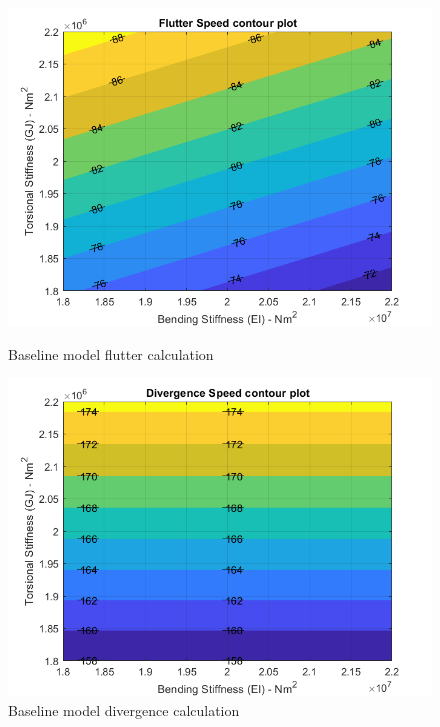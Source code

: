 \documentclass[11pt]{article}
\begin{document}
\begin{figure}[!hbt]
    \begin{minipage}{.5\textwidth}
    \centering
    \includegraphics[width = \textwidth]{figures/CooperandWright_flutter.png}
    \caption{Baseline model flutter calculation}
    \label{fig:JandJ-flutter}
    \end{minipage}%
    \begin{minipage}{.5\textwidth}
    \centering
    \includegraphics[width = \textwidth]{figures/CooperandWright_divergence.png}
    \caption{Baseline model divergence calculation}
    \label{fig:JandJ-div}
    \end{minipage}
\end{figure}
\end{document}
